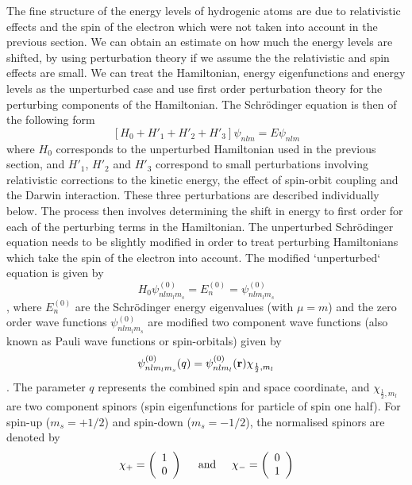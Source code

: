 \documentclass[a4paper]{serif}
\begin{document}
    The fine structure of the energy levels of hydrogenic atoms are due to relativistic
    effects and the spin of the electron which were not taken into account in the previous
    section. We can obtain an estimate on how much the energy levels are shifted, by 
    using perturbation theory if we assume the the relativistic and spin effects are 
    small. We can treat the Hamiltonian, energy eigenfunctions and energy levels as
    the unperturbed case and use first order perturbation theory for the perturbing
    components of the Hamiltonian. The Schr\"odinger equation is then of the following
    form
    \begin{displaymath}
        \left[ H_0 + H'_1 + H'_2 + H'_3 \right] \psi_{nlm} = E \psi_{nlm}
    \end{displaymath}
    where $H_0$ corresponds to the unperturbed Hamiltonian used in the previous section,
    and $H'_1$, $H'_2$ and $H'_3$ correspond to small perturbations involving relativistic
    corrections to the kinetic energy, the effect of spin-orbit coupling and the Darwin
    interaction. These three perturbations are described individually below.
    The process then involves determining the shift in energy to first order for 
    each of the perturbing terms in the Hamiltonian. The unperturbed Schr\"odinger 
    equation needs to be slightly modified in order to treat perturbing Hamiltonians
    which take the spin of the electron into account. The modified `unperturbed`
    equation is given by
    \begin{displaymath}
        H_0 \psi_{nlm_l m_s }^{(0)} = E_{n}^{(0)} = \psi_{nlm_l m_s}^{(0)} 
    \end{displaymath},
    where $E_{n}^{(0)}$ are the Schr\"odinger energy eigenvalues (with $\mu = m$) and 
    the zero order wave functions $\psi_{nlm_l m_s}^{(0)}$ are modified two component
    wave functions (also known as Pauli wave functions or spin-orbitals) given by
    \begin{displaymath}
        \psi_{nlm_l m_s}^{(0)}(q) = \psi_{nlm_l}^{(0)}({\bf r}) \chi_{\frac{1}{2},m_l}
    \end{displaymath}.
    The parameter $q$ represents the combined spin and space coordinate, and 
    $\chi_{\frac{1}{2},m_l}$ are two component spinors (spin eigenfunctions for
    particle of spin one half). For spin-up ($m_s = +1/2$) and spin-down ($m_s = -1/2$),
    the normalised spinors are denoted by
    \begin{displaymath}
        \chi_+ = \left( \begin{array}{c}
                    1 \\ 0
                 \end{array} \right)
        \hspace{5mm} \mathrm{and} \hspace{5mm}
        \chi_- = \left( \begin{array}{c}
                    0 \\ 1
                 \end{array} \right)
    \end{displaymath}
\end{document}
